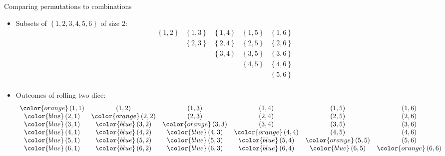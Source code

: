 \documentclass[handout]{beamer}
\theoremstyle{definition}
\begin{document}
\begin{frame}{Comparing permutations to combinations}
\begin{itemize}
\item Subsets of $\left\{1,2,3,4,5,6\right\}$ of size $2$:
\[\begin{array}{ccccc}
\left\{1,2\right\}&\left\{1,3\right\}&\left\{1,4\right\}&\left\{1,5\right\}
  &\left\{1,6\right\}\\
&\left\{2,3\right\}&\left\{2,4\right\}&\left\{2,5\right\}&\left\{2,6\right\}\\
&&\left\{3,4\right\}&\left\{3,5\right\}&\left\{3,6\right\}\\
&&&\left\{4,5\right\}&\left\{4,6\right\}\\
&&&&\left\{5,6\right\}\\
\end{array}\]
\item Outcomes of rolling two dice:
\[\begin{array}{cccccc}
{\color{orange}\left(1,1\right)}&\left(1,2\right)&\left(1,3\right)
&\left(1,4\right)&\left(1,5\right)&\left(1,6\right)\\
{\color{blue}\left(2,1\right)}&{\color{orange}\left(2,2\right)}&\left(2,3\right)
&\left(2,4\right)&\left(2,5\right)&\left(2,6\right)\\
{\color{blue}\left(3,1\right)}&{\color{blue}\left(3,2\right)}
&{\color{orange}\left(3,3\right)}
&\left(3,4\right)&\left(3,5\right)&\left(3,6\right)\\
{\color{blue}\left(4,1\right)}&{\color{blue}\left(4,2\right)}
&{\color{blue}\left(4,3\right)}
&{\color{orange}\left(4,4\right)}&\left(4,5\right)&\left(4,6\right)\\
{\color{blue}\left(5,1\right)}&{\color{blue}\left(5,2\right)}
&{\color{blue}\left(5,3\right)}
&{\color{blue}\left(5,4\right)}&{\color{orange}\left(5,5\right)}
&\left(5,6\right)\\
{\color{blue}\left(6,1\right)}&{\color{blue}\left(6,2\right)}
&{\color{blue}\left(6,3\right)}
&{\color{blue}\left(6,4\right)}&{\color{blue}\left(6,5\right)}
&{\color{orange}\left(6,6\right)}
\end{array}\]
\end{itemize}
\end{frame}
\end{document}

